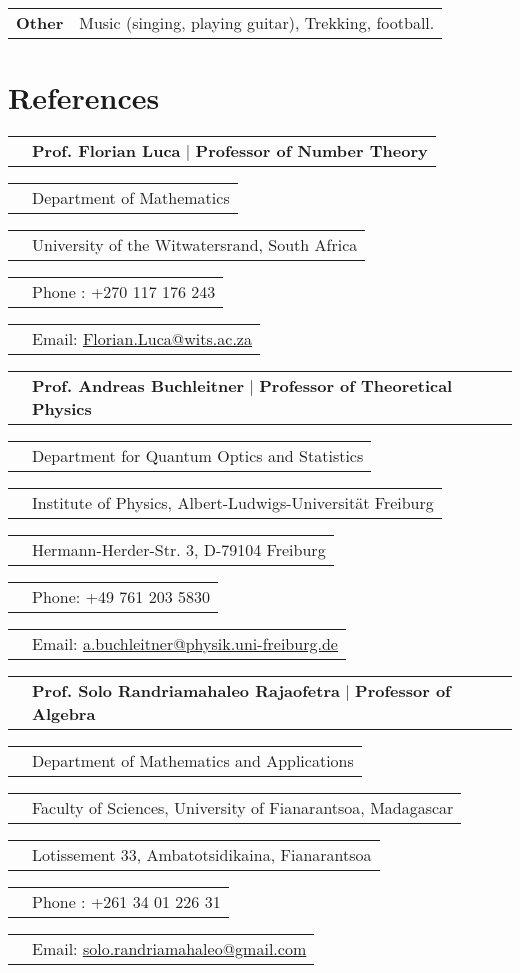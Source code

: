\documentclass[11pt,oneside]{article}
\newcommand{\cvitem}[2]{\begin{tabular}{>{\raggedleft\arraybackslash}p{2.5cm}>{\raggedright\arraybackslash}p{13cm}}
		\textbf{#1} & #2  \\
\end{tabular}}
\newcommand{\cvRefTitle}[2]{\begin{tabular}{>{\raggedleft\arraybackslash}p{2.5cm}>{\raggedright\arraybackslash}p{13cm}}
		& \textbf{#1} $|$ \textbf{#2}  \\
\end{tabular}}
\newcommand{\cvRefEntry}[1]{\begin{tabular}{>{\raggedleft\arraybackslash}p{2.5cm}>{\raggedright\arraybackslash}p{13cm}}
		& #1 \\
\end{tabular}}
\begin{document}
\vspace*{5pt}
\cvitem{Other}{Music (singing, playing guitar), Trekking, football.}


\section{References}
\cvRefTitle{Prof. Florian Luca}{Professor of Number Theory}

\cvRefEntry{Department of Mathematics}

\cvRefEntry{University of the Witwatersrand, South Africa}

\cvRefEntry{Phone : +270 117 176 243}

\cvRefEntry{Email: \href{mailto:Florian.Luca@wits.ac.za}{\color{cyan}\underline{Florian.Luca@wits.ac.za}}}


\bigskip
\cvRefTitle{Prof. Andreas Buchleitner}{Professor of Theoretical Physics}

\cvRefEntry{Department for Quantum Optics and Statistics}

\cvRefEntry{Institute of Physics, Albert-Ludwigs-Universität Freiburg}

\cvRefEntry{Hermann-Herder-Str. 3, D-79104 Freiburg}

\cvRefEntry{Phone: +49 761 203 5830}


\cvRefEntry{Email: \href{mailto:a.buchleitner@physik.uni-freiburg.de}{\color{cyan}\underline{a.buchleitner@physik.uni-freiburg.de}}}


\bigskip
\cvRefTitle{Prof. Solo Randriamahaleo Rajaofetra}{Professor of Algebra}

\cvRefEntry{Department of Mathematics and Applications}

\cvRefEntry{Faculty of Sciences, University of Fianarantsoa, Madagascar}

\cvRefEntry{Lotissement 33, Ambatotsidikaina, Fianarantsoa}

\cvRefEntry{Phone : +261 34 01 226 31}

\cvRefEntry{Email: \href{mailto:solo.randriamahaleo@gmail.com}{\color{cyan}\underline{solo.randriamahaleo@gmail.com}}}
\end{document}
